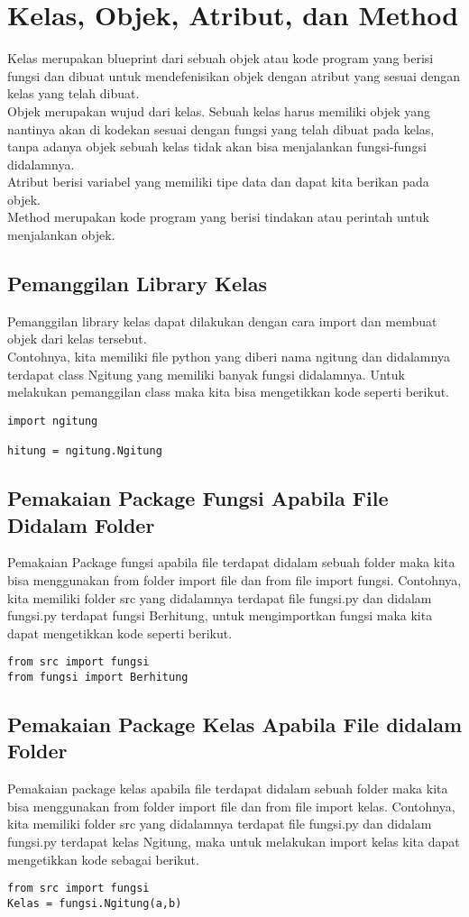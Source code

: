 \section{Kelas, Objek, Atribut, dan Method}
Kelas merupakan blueprint dari sebuah objek atau kode program yang berisi fungsi dan dibuat untuk mendefenisikan objek dengan atribut yang sesuai dengan kelas yang telah dibuat.\\
Objek merupakan wujud dari kelas. Sebuah kelas harus memiliki objek yang nantinya akan di kodekan sesuai dengan fungsi yang telah dibuat pada kelas, tanpa adanya objek sebuah kelas tidak akan bisa menjalankan fungsi-fungsi didalamnya.\\
Atribut berisi variabel yang memiliki tipe data dan dapat kita berikan pada objek.\\
Method merupakan kode program yang berisi tindakan atau perintah untuk menjalankan objek.\\

\subsection{Pemanggilan Library Kelas}
Pemanggilan library kelas dapat dilakukan dengan cara import dan membuat objek dari kelas tersebut.\\
Contohnya, kita memiliki file python yang diberi nama ngitung dan didalamnya terdapat class Ngitung yang memiliki banyak fungsi didalamnya. Untuk melakukan pemanggilan class maka kita bisa mengetikkan kode seperti berikut.
\begin{verbatim}
import ngitung

hitung = ngitung.Ngitung
\end{verbatim}

\subsection{Pemakaian Package Fungsi Apabila File Didalam Folder}
Pemakaian Package fungsi apabila file terdapat didalam sebuah folder maka kita bisa menggunakan from folder import file dan from file import fungsi. Contohnya, kita memiliki folder src yang didalamnya terdapat file fungsi.py dan didalam fungsi.py terdapat fungsi Berhitung, untuk mengimportkan fungsi maka kita dapat mengetikkan kode seperti berikut.
\begin{verbatim}
from src import fungsi
from fungsi import Berhitung
\end{verbatim}

\subsection{Pemakaian Package Kelas Apabila File didalam Folder}
Pemakaian package kelas apabila file terdapat didalam sebuah folder maka kita bisa menggunakan from folder import file dan from file import kelas. Contohnya, kita memiliki folder src yang didalamnya terdapat file fungsi.py dan didalam fungsi.py terdapat kelas Ngitung, maka untuk melakukan import kelas kita dapat mengetikkan kode sebagai berikut.
\begin{verbatim}
from src import fungsi
Kelas = fungsi.Ngitung(a,b)
\end{verbatim}

